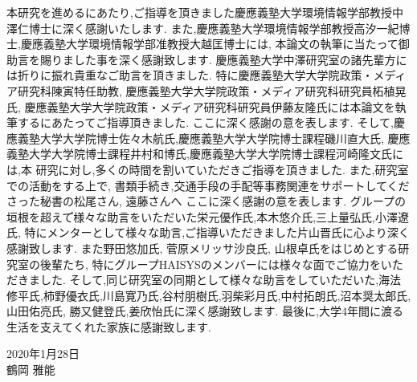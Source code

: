\begin{acknowledgment}
本研究を進めるにあたり,ご指導を頂きました慶應義塾大学環境情報学部教授中澤仁博士に深く感謝いたします.
また,慶應義塾大学環境情報学部教授高汐一紀博士,慶應義塾大学環境情報学部准教授大越匡博士には,
本論文の執筆に当たって御助言を賜りました事を深く感謝致します.
慶應義塾大学中澤研究室の諸先輩方には折りに振れ貴重なご助言を頂きました.
特に慶應義塾大学大学院政策・メディア研究科陳寅特任助教, 慶應義塾大学大学院政策・メディア研究科研究員柘植晃氏,
慶應義塾大学大学院政策・メディア研究科研究員伊藤友隆氏には本論文を執筆するにあたってご指導頂きました.
ここに深く感謝の意を表します.
そして,慶應義塾大学大学院博士佐々木航氏,慶應義塾大学大学院博士課程磯川直大氏,
慶應義塾大学大学院博士課程井村和博氏,慶應義塾大学大学院博士課程河崎隆文氏には,本
研究に対し,多くの時間を割いていただきご指導を頂きました.
また,研究室での活動をする上で, 書類手続き,交通手段の手配等事務関連をサポートしてくださった秘書の松尾さん, 遠藤さんへ
ここに深く感謝の意を表します.
グループの垣根を超えて゚様々な助言をいただいた栄元優作氏,本木悠介氏,三上量弘氏,小澤遼氏,
特にメンターとして様々な助言,ご指導いただきました片山晋氏に心より深く感謝致します.
また野田悠加氏, 菅原メリッサ沙良氏, 山根卓氏をはじめとする研究室の後輩たち, 特にグループHAISYSのメンバーには様々な面でご協力をいただきました.
そして,同じ研究室の同期として様々な助言をしていただいた,海法修平氏,柿野優衣氏,川島寛乃氏,谷村朋樹氏,羽柴彩月氏,中村拓朗氏,沼本奨太郎氏,山田佑亮氏,
勝又健登氏,姜欣怡氏に深く感謝致します.
最後に,大学4年間に渡る生活を支えてくれた家族に感謝致します.\\
\begin{flushright}
2020年1月28日\\
鶴岡 雅能
\end{flushright}

\end{acknowledgment}
